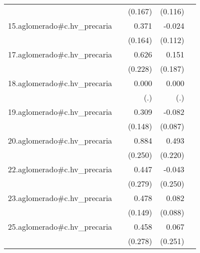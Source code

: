 {\begin{longtable}{l*{4}{D{.}{.}{-1}}}
            &                     &     (0.167)         &     (0.116)         &                     \\
\addlinespace
15.aglomerado#c.hv\_precaria&                     &       0.371\sym{*}  &      -0.024         &                     \\
            &                     &     (0.164)         &     (0.112)         &                     \\
\addlinespace
17.aglomerado#c.hv\_precaria&                     &       0.626\sym{**} &       0.151         &                     \\
            &                     &     (0.228)         &     (0.187)         &                     \\
\addlinespace
18.aglomerado#c.hv\_precaria&                     &       0.000         &       0.000         &                     \\
            &                     &         (.)         &         (.)         &                     \\
\addlinespace
19.aglomerado#c.hv\_precaria&                     &       0.309\sym{*}  &      -0.082         &                     \\
            &                     &     (0.148)         &     (0.087)         &                     \\
\addlinespace
20.aglomerado#c.hv\_precaria&                     &       0.884\sym{***}&       0.493\sym{*}  &                     \\
            &                     &     (0.250)         &     (0.220)         &                     \\
\addlinespace
22.aglomerado#c.hv\_precaria&                     &       0.447         &      -0.043         &                     \\
            &                     &     (0.279)         &     (0.250)         &                     \\
\addlinespace
23.aglomerado#c.hv\_precaria&                     &       0.478\sym{**} &       0.082         &                     \\
            &                     &     (0.149)         &     (0.088)         &                     \\
\addlinespace
25.aglomerado#c.hv\_precaria&                     &       0.458         &       0.067         &                     \\
            &                     &     (0.278)         &     (0.251)         &                     \\

\end{longtable}}
